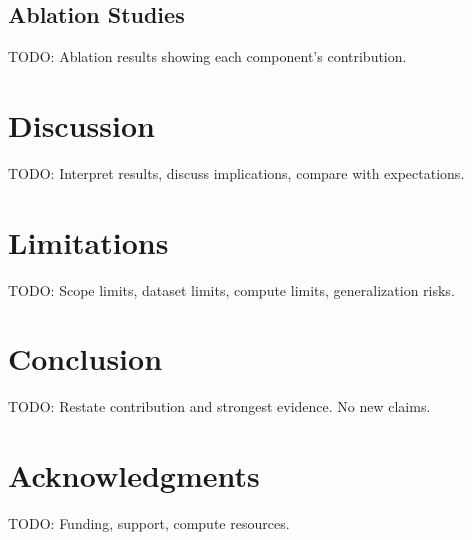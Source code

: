 \documentclass[journal]{IEEEtran}
\begin{document}
\subsection{Ablation Studies}
TODO: Ablation results showing each component's contribution.

\section{Discussion}
\label{sec:discussion}
TODO: Interpret results, discuss implications, compare with expectations.

\section{Limitations}
\label{sec:limitations}
TODO: Scope limits, dataset limits, compute limits, generalization risks.

\section{Conclusion}
\label{sec:conclusion}
TODO: Restate contribution and strongest evidence. No new claims.

\section*{Acknowledgments}
TODO: Funding, support, compute resources.



\end{document}
